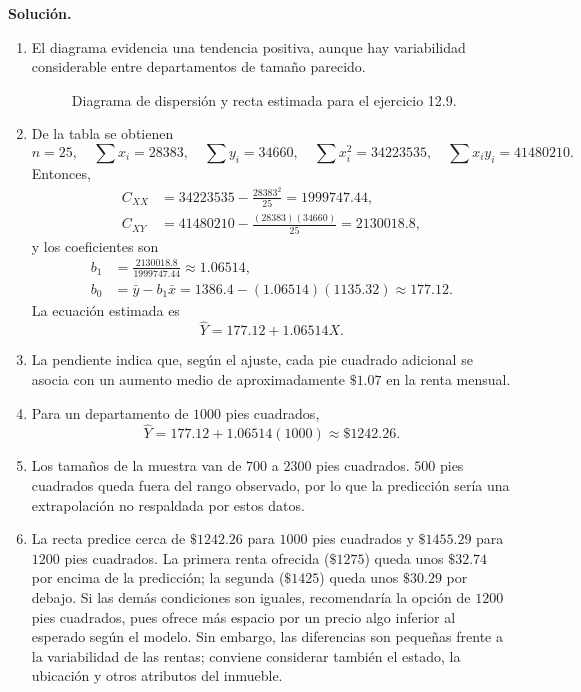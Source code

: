 \textbf{Solución.}
\begin{enumerate}
    \item[\textbf{a)}] El diagrama evidencia una tendencia positiva, aunque hay variabilidad considerable entre departamentos de tamaño parecido.
    \begin{figure}[H]
    \centering
    
    \caption{Diagrama de dispersión y recta estimada para el ejercicio 12.9.}
    \label{fig:clase4-rent}
    \end{figure}
    \item[\textbf{b)}] De la tabla se obtienen
    \[
    n=25,\quad \sum x_i=28383,\quad \sum y_i=34660,\quad
    \sum x_i^2=34223535,\quad \sum x_iy_i=41480210.
    \]
    Entonces,
    \begin{align*}
    C_{XX}&=34223535-\frac{28383^2}{25}=1999747.44,\\
    C_{XY}&=41480210-\frac{(28383)(34660)}{25}=2130018.8,
    \end{align*}
    y los coeficientes son
    \begin{align*}
    b_1&=\frac{2130018.8}{1999747.44}\approx1.06514,\\
    b_0&=\bar y-b_1\bar x
    =1386.4-(1.06514)(1135.32)\approx177.12.
    \end{align*}
    La ecuación estimada es
    \[
    \widehat Y=177.12+1.06514X.
    \]
    \item[\textbf{c)}] La pendiente indica que, según el ajuste, cada pie cuadrado adicional se asocia con un aumento medio de aproximadamente $\$1.07$ en la renta mensual.
    \item[\textbf{d)}] Para un departamento de $1000$ pies cuadrados,
    \[
    \widehat Y=177.12+1.06514(1000)\approx\$1242.26.
    \]
    \item[\textbf{e)}] Los tamaños de la muestra van de $700$ a $2300$ pies cuadrados. $500$ pies cuadrados queda fuera del rango observado, por lo que la predicción sería una extrapolación no respaldada por estos datos.
    \item[\textbf{f)}] La recta predice cerca de $\$1242.26$ para $1000$ pies cuadrados y $\$1455.29$ para $1200$ pies cuadrados. La primera renta ofrecida ($\$1275$) queda unos $\$32.74$ por encima de la predicción; la segunda ($\$1425$) queda unos $\$30.29$ por debajo. Si las demás condiciones son iguales, recomendaría la opción de $1200$ pies cuadrados, pues ofrece más espacio por un precio algo inferior al esperado según el modelo. Sin embargo, las diferencias son pequeñas frente a la variabilidad de las rentas; conviene considerar también el estado, la ubicación y otros atributos del inmueble.
\end{enumerate}

